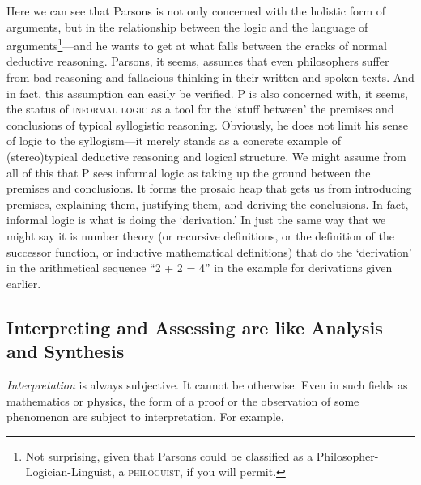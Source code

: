 \documentclass{article}
\begin{document}
Here we can see that Parsons is not only concerned with the holistic form of arguments, but in the relationship between the logic and the language of arguments\footnote{Not surprising, given that Parsons could be classified as a Philosopher-Logician-Linguist, a \textsc{philoguist}, if you will permit.}---and he wants to get at what falls between the cracks of normal deductive reasoning. Parsons, it seems, assumes that even philosophers suffer from bad reasoning and fallacious thinking in their written and spoken texts. And in fact, this assumption can easily be verified. P is also concerned with, it seems, the status of \textsc{informal logic} as a tool for the `stuff between' the premises and conclusions of typical syllogistic reasoning. Obviously, he does not limit his sense of logic to the syllogism---it merely stands as a concrete example of (stereo)typical deductive reasoning and logical structure. We might assume from all of this that P sees informal logic as taking up the ground between the premises and conclusions. It forms the prosaic heap that gets us from introducing premises, explaining them, justifying them, and deriving the conclusions. In fact, informal logic is what is doing the `derivation.' In just the same way that we might say it is number theory (or recursive definitions, or the definition of the successor function, or inductive mathematical definitions) that do the `derivation' in the arithmetical sequence ``2 + 2 = 4'' in the example for derivations given earlier. 


\subsection{Interpreting and Assessing are like Analysis and Synthesis}
\textsl{Interpretation} is always subjective. It cannot be otherwise. Even in such fields as mathematics or physics, the form of a proof or the observation of some phenomenon are subject to interpretation. For example,
\end{document}
